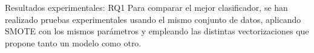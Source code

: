 \documentclass[final]{beamer}
\newlength{\onecolwid}
\newlength{\twocolwid}
\begin{document}
\begin{frame}[t]
\begin{columns}[t]
\begin{column}{\twocolwid}
        \begin{columns}[t,totalwidth=\twocolwid] %
            \begin{column}{\twocolwid}
            \begin{block}{Resultados experimentales: RQ1}
            Para comparar el mejor clasificador, se han realizado pruebas experimentales usando el mismo conjunto de datos, aplicando SMOTE con los mismos parámetros y empleando las distintas vectorizaciones que propone tanto un modelo como otro.
            
                \begin{column}{\onecolwid} %
                

\end{column}
\end{block}
\end{column}
\end{columns}
\end{column}
\end{columns}
\end{frame}
\end{document}
